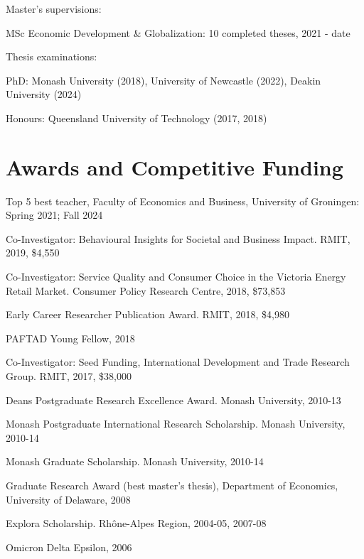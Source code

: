 \documentclass[letterpaper]{article}
\renewenvironment{itemize}{
  \begin{list}{}{
    \setlength{\leftmargin}{1.5em}
  }
}{
  \end{list}
}
\begin{document}
\begin{itemize}
		\item Master's supervisions:
	\begin{itemize}
		\item MSc Economic Development \& Globalization: 10 completed theses, 2021 - date
	\end{itemize}
	
	\item Thesis examinations:
	\begin{itemize}
		\item PhD: Monash University (2018), University of Newcastle (2022), Deakin University (2024)
		\item Honours: Queensland University of Technology (2017, 2018)
	\end{itemize}
	
	
\end{itemize}



\section*{Awards and Competitive Funding}
\begin{itemize}
	\item Top 5 best teacher, Faculty of Economics and Business, University of Groningen: Spring 2021; Fall 2024
	\item Co-Investigator: Behavioural Insights for Societal and Business Impact. RMIT, 2019, \$4,550
	\item Co-Investigator: Service Quality and Consumer Choice in the Victoria Energy Retail Market. Consumer Policy Research Centre, 2018, \$73,853
	\item Early Career Researcher Publication Award. RMIT, 2018, \$4,980
	\item PAFTAD Young Fellow, 2018
	\item Co-Investigator: Seed Funding, International Development and Trade Research Group. RMIT, 2017, \$38,000
	\item Dean\textquotesingle s Postgraduate Research Excellence Award. Monash University, 
	2010-13 	
	\item Monash Postgraduate International Research Scholarship. Monash University, 2010-14 	
	\item Monash Graduate Scholarship. Monash University, 2010-14
	\item Graduate Research Award (best master's thesis), Department of Economics, University of Delaware, 2008
	\item Explo\textquotesingle ra Scholarship. Rh\^one-Alpes Region, 2004-05, 2007-08
	\item Omicron Delta Epsilon, 2006
	
\end{itemize}
\end{document}
